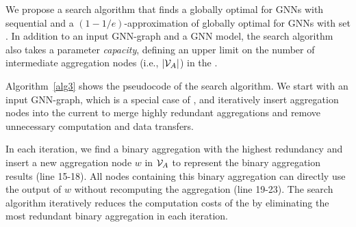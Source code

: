 We propose a \xg search algorithm that finds a globally optimal \xg for GNNs with sequential  and a $(1-1/e)$-approximation of globally optimal \xgs for GNNs with set .
In addition to an input GNN-graph and a GNN model, the search algorithm also takes a parameter {\em capacity}, defining an upper limit on the number of intermediate aggregation nodes (i.e., $|\mathcal{V}_A|$) in the \xg.

Algorithm~\ref{alg3} shows the pseudocode of the \xg search algorithm.
We start with an input GNN-graph, which is a special case of \xgs, and iteratively insert aggregation nodes into the current \xg to merge highly redundant aggregations and remove unnecessary computation and data transfers.

In each iteration, we find a binary aggregation with the highest redundancy and insert a new aggregation node $w$ in $\mathcal{V}_A$ to represent the binary aggregation results (line 15-18).
All nodes containing this binary aggregation can directly use the output of $w$ without recomputing the aggregation (line 19-23).
The \xg search algorithm iteratively reduces the computation costs of the \xg by eliminating the most redundant binary aggregation in each iteration.

